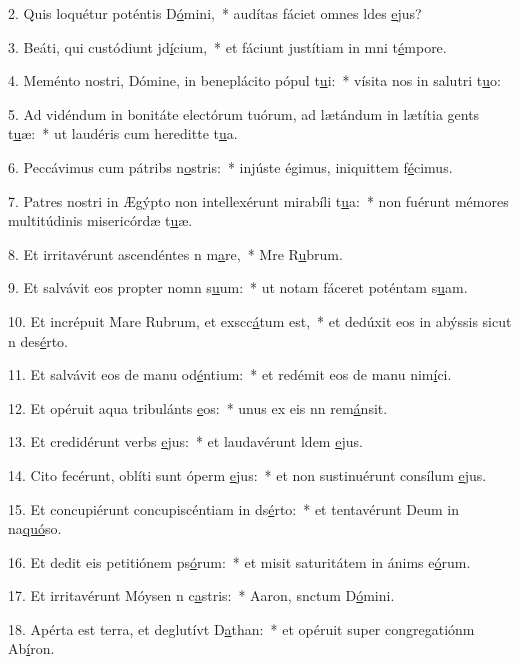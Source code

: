 2. Quis loquétur poténtis D\uline{ó}mini,~* audítas fáciet omnes ldes \uline{e}jus?\par 
3. Beáti, qui custódiunt jd\uline{í}cium,~* et fáciunt justítiam in mni t\uline{é}mpore.\par 
4. Meménto nostri, Dómine, in beneplácito pópul t\uline{u}i:~* vísita nos in salutri t\uline{u}o:\par 
5. Ad vidéndum in bonitáte electórum tuórum, ad lætándum in lætítia gents t\uline{u}æ:~* ut laudéris cum hereditte t\uline{u}a.\par 
6. Peccávimus cum pátribs n\uline{o}stris:~* injúste égimus, iniquittem f\uline{é}cimus.\par 
7. Patres nostri in Ægýpto non intellexérunt mirabíli t\uline{u}a:~* non fuérunt mémores multitúdinis misericórdæ t\uline{u}æ.\par 
8. Et irritavérunt ascendéntes n m\uline{a}re,~* Mre R\uline{u}brum.\par 
9. Et salvávit eos propter nomn s\uline{u}um:~* ut notam fáceret poténtam s\uline{u}am.\par 
10. Et incrépuit Mare Rubrum, et exscc\uline{á}tum est,~* et dedúxit eos in abýssis sicut n des\uline{é}rto.\par 
11. Et salvávit eos de manu od\uline{é}ntium:~* et redémit eos de manu nim\uline{í}ci.\par 
12. Et opéruit aqua tribulánts \uline{e}os:~* unus ex eis nn rem\uline{á}nsit.\par 
13. Et credidérunt verbs \uline{e}jus:~* et laudavérunt ldem \uline{e}jus.\par 
14. Cito fecérunt, oblíti sunt óperm \uline{e}jus:~* et non sustinuérunt consílum \uline{e}jus.\par 
15. Et concupiérunt concupiscéntiam in ds\uline{é}rto:~* et tentavérunt Deum in na\uline{quó}so.\par 
16. Et dedit eis petitiónem ps\uline{ó}rum:~* et misit saturitátem in ánims e\uline{ó}rum.\par 
17. Et irritavérunt Móysen n c\uline{a}stris:~* Aaron, snctum D\uline{ó}mini.\par 
18. Apérta est terra, et deglutívt D\uline{a}than:~* et opéruit super congregatiónm Ab\uline{í}ron.\par 
